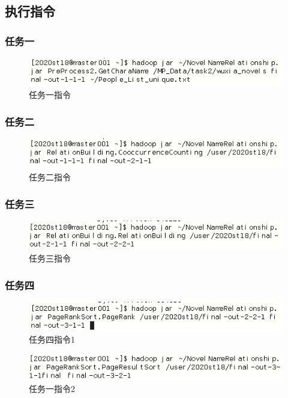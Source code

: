 \documentclass[a4paper,UTF8]{article}
\numberwithin{equation}{section}
\begin{document}
\subsection{执行指令}
\subsubsection{任务一}
\begin{figure}[H]
    \centering
    \includegraphics[width = 15cm]{task1-1-input.png}
    \caption{任务一指令}
\end{figure}

\subsubsection{任务二}
\begin{figure}[H]
    \centering
    \includegraphics[width = 15cm]{task2-1-input.png}
    \caption{任务二指令}
\end{figure}

\subsubsection{任务三}
\begin{figure}[H]
    \centering
    \includegraphics[width = 15cm]{task3-1-input.png}
    \caption{任务三指令}
\end{figure}

\subsubsection{任务四}
\begin{figure}[H]
    \centering
    \includegraphics[width = 15cm]{task4-1-input.png}
    \caption{任务四指令1}
\end{figure}
\begin{figure}[H]
    \centering
    \includegraphics[width = 15cm]{task4-2-input.png}
    \caption{任务一指令2}
\end{figure}
\end{document}
